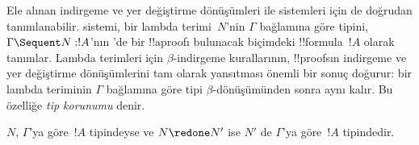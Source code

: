 



Ele alınan indirgeme ve yer değiştirme dönüşümleri  ile
 sistemleri için de doğrudan tanımlanabilir.  sistemi,
bir lambda terimi~$N$'nin $\Gamma$ bağlamına göre tipini, $\Gamma \Sequent
N : !A$'nın 'de bir !!a{proof}{}ı bulunacak biçimdeki
!!{formula}~$!A$ olarak tanımlar. Lambda terimleri için $\beta$-indirgeme
kurallarının, !!{proof}s{}ın indirgeme ve yer değiştirme dönüşümlerini tam
olarak yansıtması önemli bir sonuç doğurur: bir lambda teriminin $\Gamma$
bağlamına göre tipi $\beta$-dönüşümünden sonra aynı kalır. Bu özelliğe
\emph{tip korunumu} denir.

\begin{prop}
$N$, $\Gamma$'ya göre~$!A$ tipindeyse ve $N \redone N'$ ise $N'$ de
$\Gamma$'ya göre~$!A$ tipindedir.
\end{prop}

